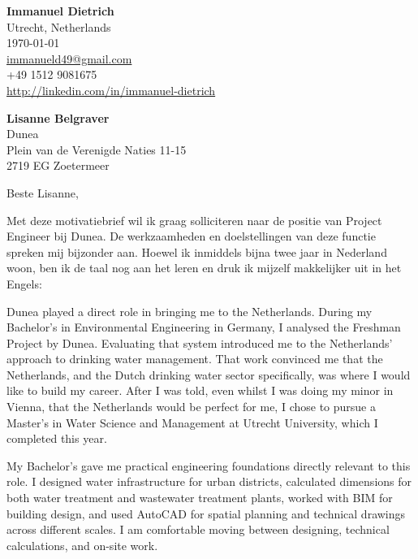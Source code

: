 \documentclass[11pt]{report}
\begin{document}
 
\begin{titlepage}

    \begin{minipage}[t]{0.95\textwidth}
        \hfill
        \raggedleft
        \textbf{Immanuel Dietrich} \\
        Utrecht, Netherlands \\
        \today\\
        \href{mailto:immanueld49@gmail.com}{immanueld49@gmail.com} \\
        +49 1512 9081675 \\
        \url{http://linkedin.com/in/immanuel-dietrich}
    \end{minipage}

\raggedright \textbf{Lisanne Belgraver} \\ Dunea  \\ Plein van de Verenigde Naties 11-15 \\ 2719 EG Zoetermeer \\ 

\vspace{0.7em}

\raggedright Beste Lisanne,\\


\vspace{0.7em}

Met deze motivatiebrief wil ik graag solliciteren naar de positie van Project Engineer bij Dunea. De werkzaamheden en doelstellingen van deze functie spreken mij bijzonder aan. 
Hoewel ik inmiddels bijna twee jaar in Nederland woon, ben ik de taal nog aan het leren en druk ik mijzelf makkelijker uit in het Engels:

\vspace{0.7em}

Dunea played a direct role in bringing me to the Netherlands. During my Bachelor's in Environmental Engineering in Germany, I analysed the Freshman Project by Dunea. 
Evaluating that system introduced me to the Netherlands' approach to drinking water management. That work convinced me that the Netherlands, and the Dutch drinking water 
sector specifically, was where I would like to build my career. After I was told, even whilst I was doing my minor in Vienna, that the Netherlands would be perfect for me, 
I chose to pursue a Master's in Water Science and Management at Utrecht University, which I completed this year.

\vspace{0.7em}

My Bachelor's gave me practical engineering foundations directly relevant to this role. I designed water infrastructure for urban districts, calculated dimensions for both water treatment and wastewater treatment plants, 
worked with BIM for building design, and used AutoCAD for spatial planning and technical drawings across different scales. I am comfortable moving between designing, technical calculations, and on-site work.


\end{titlepage}
\end{document}
